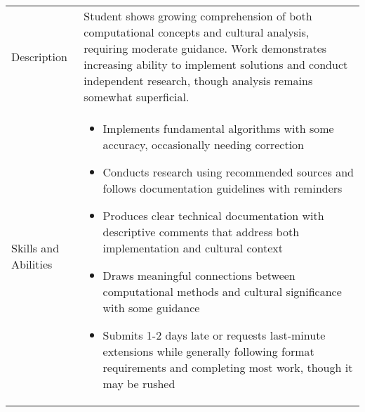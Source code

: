\documentclass[12pt]{article}
\begin{document}
\begin{table}[b]
\renewcommand{\arraystretch}{1.5}
\begin{tabular}{>{\raggedright\arraybackslash}p{2cm}|>{\raggedright\arraybackslash}p{14cm}}
\toprule
\multicolumn{2}{l}{\textbf{Developing}} \\
\midrule
Description & Student shows growing comprehension of both computational concepts and cultural analysis, requiring moderate guidance. Work demonstrates increasing ability to implement solutions and conduct independent research, though analysis remains somewhat superficial. \\
\midrule
Skills and Abilities & 
\begin{itemize}
    \item Implements fundamental algorithms with some accuracy, occasionally needing correction
    \item Conducts research using recommended sources and follows documentation guidelines with reminders
    \item Produces clear technical documentation with descriptive comments that address both implementation and cultural context
    \item Draws meaningful connections between computational methods and cultural significance with some guidance
    \item Submits 1-2 days late or requests last-minute extensions while generally following format requirements and completing most work, though it may be rushed
\end{itemize} \\
\bottomrule
\end{tabular}
\end{table}

\clearpage %
\end{document}

